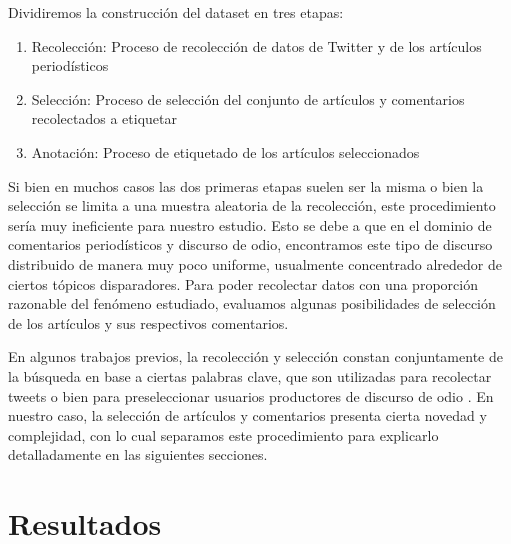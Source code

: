 Dividiremos la construcción del dataset en tres etapas:

\begin{enumerate}
    \item Recolección: Proceso de recolección de datos de Twitter y de los artículos periodísticos
    \item Selección: Proceso de selección del conjunto de artículos y comentarios recolectados a etiquetar
    \item Anotación: Proceso de etiquetado de los artículos seleccionados
\end{enumerate}

Si bien en muchos casos las dos primeras etapas suelen ser la misma o bien la selección se limita a una muestra aleatoria de la recolección, este procedimiento sería muy ineficiente para nuestro estudio. Esto se debe a que en el dominio de comentarios periodísticos y discurso de odio, encontramos este tipo de discurso distribuido de manera muy poco uniforme, usualmente concentrado alrededor de ciertos tópicos disparadores. Para poder recolectar datos con una proporción razonable del fenómeno estudiado, evaluamos algunas posibilidades de selección de los artículos y sus respectivos comentarios.

En algunos trabajos previos, la recolección y selección constan conjuntamente de la búsqueda en base a ciertas palabras clave, que son utilizadas para recolectar tweets o bien para preseleccionar usuarios productores de discurso de odio \cite{waseem2016hateful,hateval2019semeval}. En nuestro caso, la selección de artículos y comentarios presenta cierta novedad y complejidad, con lo cual separamos este procedimiento para explicarlo detalladamente en las siguientes secciones.





\section{Resultados}

